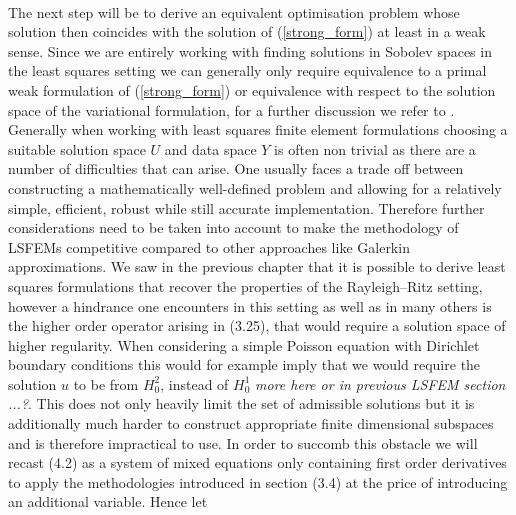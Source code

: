 \documentclass[../draft_1.tex]{subfiles}
\begin{document}
\smallskip
\\
The next step will be to derive an equivalent optimisation problem whose solution then coincides with the solution of (\ref{strong_form}) at least in a weak sense. Since we are entirely working with finding solutions in Sobolev spaces in the least squares setting we can generally only require equivalence to a primal weak formulation of (\ref{strong_form}) or equivalence with respect to the solution space of the variational formulation, for a further discussion we refer to \cite{bochev2009least}. Generally when working with least squares finite element formulations choosing a suitable solution space $U$ and data space $Y$ is often non trivial as there are a number of difficulties that can arise. One usually faces a trade off between constructing a mathematically well-defined problem and allowing for a relatively simple, efficient, robust while still accurate implementation. Therefore further considerations need to be taken into account to make the methodology of LSFEMs competitive compared to other approaches like Galerkin approximations. We saw in the previous chapter that it is possible to derive least squares formulations that recover the properties of the Rayleigh--Ritz setting, however a hindrance one encounters in this setting as well as in many others is the higher order operator arising in (3.25), that would require a solution space of higher regularity. When considering a simple Poisson equation with Dirichlet boundary conditions this would for example imply that we would require the solution $u$ to be from $H_0^2$, instead of $H_0^1$ \cite{bochev2009least} \textit{more here or in previous LSFEM section ...?}. This does not only heavily limit the set of admissible solutions but it is additionally much harder to construct appropriate finite dimensional subspaces and is therefore impractical to use. In order to succomb this obstacle we will recast (4.2) as a system of mixed equations only containing first order derivatives to apply the methodologies introduced in section (3.4) at the price of introducing an additional variable. Hence let
\end{document}
